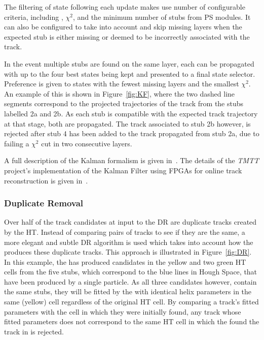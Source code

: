 The filtering of state following each update makes use number of configurable criteria, including \pT, $\chi^2$, and the minimum number of stubs from PS modules.
It can also be configured to take into account and skip missing layers when the expected stub is either missing or deemed to be incorrectly associated with the track.

In the event multiple stubs are found on the same layer, each can be propagated with up to the four best states being kept and presented to a final state selector.
Preference is given to states with the fewest missing layers and the smallest $\chi^2$.
An example of this is shown in Figure~\ref{fig:KF}, where the two dashed line segments correspond to the projected trajectories of the track from the stubs labelled 2a and 2b.
As each stub is compatible with the expected track trajectory at that stage, both are propagated.
The track associated to stub 2b however, is rejected after stub 4 has been added to the track propagated from stub 2a, due to failing a $\chi^2$ cut in two consecutive layers.

%
A full description of the Kalman formalism is given in~\cite{Fruhwirth:1987fm}.
The details of the \emph{TMTT} project's implementation of the Kalman Filter using FPGAs for online track reconstruction is given in~\cite{TMTT_JINST,SSummers}.

\subsubsection{Duplicate Removal}
Over half of the track candidates at input to the DR are duplicate tracks created by the HT.
Instead of comparing pairs of tracks to see if they are the same, a more elegant and subtle DR algorithm is used which takes into account how the \HT produces these duplicate tracks.
This approach is illustrated in Figure~\ref{fig:DR}.
In this example, the \HT has produced candidates in the yellow and two green HT cells from the five stubs, which correspond to the blue lines in Hough Space, that have been produced by a single particle.
As all three candidates however, contain the same stubs, they will be fitted by the \KF with identical helix parameters in the same (yellow) cell regardless of the original HT cell.
By comparing a track's fitted parameters with the \HT cell in which they were initially found, any track whose fitted parameters does not correspond to the same HT cell in which the \HT found the track in is rejected.

